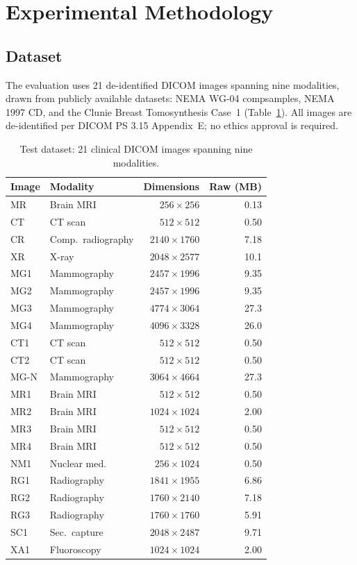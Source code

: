 \documentclass[journal]{IEEEtran}
\begin{document}
\section{Experimental Methodology}
\label{sec:methodology}

\subsection{Dataset}

The evaluation uses 21 de-identified DICOM images spanning nine modalities, drawn
from publicly available datasets: NEMA WG-04 compsamples, NEMA 1997 CD, and the
Clunie Breast Tomosynthesis Case~1 (Table~\ref{tab:dataset}). All images are
de-identified per DICOM PS 3.15 Appendix~E; no ethics approval is required.

\begin{table}[htbp]
\centering
\caption{Test dataset: 21 clinical DICOM images spanning nine modalities.}
\label{tab:dataset}
\scriptsize
\begin{tabular}{llrr}
\toprule
Image & Modality & Dimensions & Raw (MB) \\
\midrule
MR   & Brain MRI      & $256{\times}256$   & 0.13 \\
CT   & CT scan        & $512{\times}512$   & 0.50 \\
CR   & Comp.\ radiography & $2140{\times}1760$ & 7.18 \\
XR   & X-ray          & $2048{\times}2577$ & 10.1 \\
MG1  & Mammography    & $2457{\times}1996$ & 9.35 \\
MG2  & Mammography    & $2457{\times}1996$ & 9.35 \\
MG3  & Mammography    & $4774{\times}3064$ & 27.3 \\
MG4  & Mammography    & $4096{\times}3328$ & 26.0 \\
CT1  & CT scan        & $512{\times}512$   & 0.50 \\
CT2  & CT scan        & $512{\times}512$   & 0.50 \\
MG-N & Mammography    & $3064{\times}4664$ & 27.3 \\
MR1  & Brain MRI      & $512{\times}512$   & 0.50 \\
MR2  & Brain MRI      & $1024{\times}1024$ & 2.00 \\
MR3  & Brain MRI      & $512{\times}512$   & 0.50 \\
MR4  & Brain MRI      & $512{\times}512$   & 0.50 \\
NM1  & Nuclear med.   & $256{\times}1024$  & 0.50 \\
RG1  & Radiography    & $1841{\times}1955$ & 6.86 \\
RG2  & Radiography    & $1760{\times}2140$ & 7.18 \\
RG3  & Radiography    & $1760{\times}1760$ & 5.91 \\
SC1  & Sec.~capture   & $2048{\times}2487$ & 9.71 \\
XA1  & Fluoroscopy    & $1024{\times}1024$ & 2.00 \\
\bottomrule
\end{tabular}
\end{table}
\end{document}
